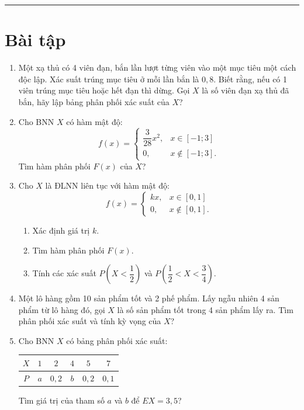 \vspace{1.5em}
\hrule
\vspace{1.5em}

\section{Bài tập}

\begin{enumerate}[label=\textbf{\arabic*.}]
    \item Một xạ thủ có 4 viên đạn, bắn lần lượt từng viên vào một mục tiêu một cách độc lập. Xác suất trúng mục tiêu ở mỗi lần bắn là $0{,}8$. Biết rằng, nếu có 1 viên trúng mục tiêu hoặc hết đạn thì dừng. Gọi $X$ là số viên đạn xạ thủ đã bắn, hãy lập bảng phân phối xác suất của $X$?

    \item Cho BNN $X$ có hàm mật độ:
    \[
    f(x) = \begin{cases}
    \dfrac{3}{28} x^2, & x \in [-1; 3] \\
    0, & x \notin [-1; 3].
    \end{cases}
    \]
    Tìm hàm phân phối $F(x)$ của $X$?

    \item Cho $X$ là ĐLNN liên tục với hàm mật độ:
    \[
    f(x) = \begin{cases}
    kx, & x \in [0, 1] \\
    0, & x \notin [0, 1].
    \end{cases}
    \]
    \begin{enumerate}[label=\arabic*)]
        \item Xác định giá trị $k$.
        \item Tìm hàm phân phối $F(x)$.
        \item Tính các xác suất $P\left(X < \dfrac{1}{2}\right)$ và $P\left(\dfrac{1}{2} < X < \dfrac{3}{4}\right)$.
    \end{enumerate}

    \item Một lô hàng gồm 10 sản phẩm tốt và 2 phế phẩm. Lấy ngẫu nhiên 4 sản phẩm từ lô hàng đó, gọi $X$ là số sản phẩm tốt trong 4 sản phẩm lấy ra. Tìm phân phối xác suất và tính kỳ vọng của $X$?

    \item Cho BNN $X$ có bảng phân phối xác suất:
    \begin{center}
    \begin{tabular}{|c|c|c|c|c|c|}
    \hline
    $X$ & $1$ & $2$ & $4$ & $5$ & $7$ \\
    \hline
    $P$ & $a$ & $0{,}2$ & $b$ & $0{,}2$ & $0{,}1$ \\
    \hline
    \end{tabular}
    \end{center}
    Tìm giá trị của tham số $a$ và $b$ để $EX = 3{,}5$?


\end{enumerate}
